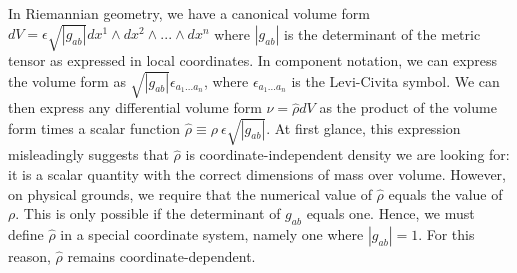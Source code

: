 \documentclass[letterpaper]{article}
\begin{document}
In Riemannian geometry, we have a canonical volume form $dV = \epsilon \sqrt{|g_{ab}|} dx^1 \wedge dx^2 \wedge ... \wedge dx^n$ where $|g_{ab}|$ is the determinant of the metric tensor as expressed in local coordinates. In component notation, we can express the volume form as $\sqrt{|g_{ab}|}\epsilon_{a_1 ... a_n}$, where $\epsilon_{a_1 ... a_n}$ is the Levi-Civita symbol. We can then express any differential volume form $\nu = \hat{\rho} dV$ as the product of the volume form times a scalar function $\hat{\rho} \equiv \rho \ \epsilon \sqrt{|g_{ab}|}$. At first glance, this expression misleadingly suggests that $\hat{\rho}$ is coordinate-independent density we are looking for: it is a scalar quantity with the correct dimensions of mass over volume. However, on physical grounds, we require that the numerical value of $\hat{\rho} $ equals the value of $\rho$. This is only possible if the determinant of $g_{ab}$ equals one. Hence, we must define $\hat{\rho} $ in a special coordinate system, namely one where $|g_{ab}| = 1$. For this reason, $\hat{\rho} $ remains coordinate-dependent. 
\end{document}
